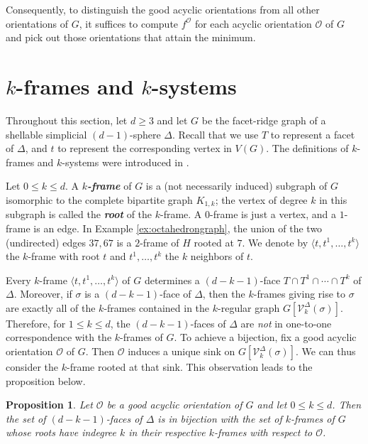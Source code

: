 \documentclass[11pt,twoside]{article}
\newtheorem{proposition}[theorem]{Proposition}
\theoremstyle{definition}
\newcommand{\cO}{\mathcal{O}}
\newcommand{\cV}{\mathcal{V}}
\begin{document}
Consequently, to distinguish the good acyclic orientations from all other orientations of $G$, it suffices to compute $f^\cO$ for each acyclic orientation $\cO$ of $G$ and pick out those orientations that attain the minimum.



















\section{$k$-frames and $k$-systems} \label{sec:ksystem}
Throughout this section, let $d \ge 3$ and let $G$ be the facet-ridge graph of a shellable simplicial $(d-1)$-sphere $\Delta$. Recall that we use $T$ to represent a facet of $\Delta$, and $t$ to represent the corresponding vertex in $V(G)$. The definitions of $k$-frames and $k$-systems were introduced in \cite{Joswig}. 

Let $0 \le k \le d$. A \textbf{\emph{$k$-frame}} of $G$ is a (not necessarily induced) subgraph of $G$ isomorphic
to the complete bipartite graph $K_{1,k}$; the vertex of degree $k$ in this subgraph is called the \textbf{\emph{root}} of the $k$-frame. A $0$-frame is just a vertex, and a $1$-frame is an edge. In Example \ref{ex:octahedrongraph}, the union of the two (undirected) edges $37, 67$ is a $2$-frame of $H$ rooted at $7$. We denote by $\langle t, t^1, \dots, t^k\rangle$ the $k$-frame with root $t$ and $t^1, \dots, t^k$ the $k$ neighbors of $t$.

Every $k$-frame $\langle t, t^1, \dots, t^k \rangle$ of $G$ determines a $(d-k-1)$-face $T \cap T^1 \cap \cdots \cap T^k$ of $\Delta$. Moreover, if $\sigma$ is a $(d-k-1)$-face of $\Delta$, then the $k$-frames giving rise to $\sigma$ are exactly all of the $k$-frames contained in the $k$-regular graph $G[\cV^\Delta_k(\sigma)]$. Therefore, for $1 \le k \le d$, the $(d-k-1)$-faces of $\Delta$ are \emph{not} in one-to-one correspondence with the $k$-frames of $G$. To achieve a bijection, fix a good acyclic orientation $\cO$ of $G$. Then $\cO$ induces a unique sink on $G[\cV^\Delta_k(\sigma)]$. We can thus consider the $k$-frame rooted at that sink. This observation leads to the proposition below. 

\begin{proposition}\label{prop:kframecorrespondence}
    Let $\cO$ be a good acyclic orientation of $G$ and let $0 \le k \le d$. Then the set of $(d-k-1)$-faces of $\Delta$ is in bijection with the set of $k$-frames of $G$ whose roots have indegree $k$ in their respective $k$-frames with respect to $\cO$. 
\end{proposition}
\end{document}

